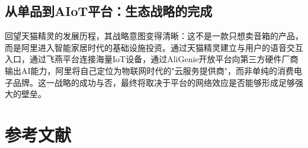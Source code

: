 \documentclass[12pt, a4paper, twoside, openright]{book}
\begin{document}
\section{从单品到AIoT平台：生态战略的完成}

回望天猫精灵的发展历程，其战略意图变得清晰：这不是一款只想卖音箱的产品，而是阿里进入智能家居时代的基础设施投资。通过天猫精灵建立与用户的语音交互入口，通过飞燕平台连接海量IoT设备，通过AliGenie开放平台向第三方硬件厂商输出AI能力，阿里将自己定位为物联网时代的"云服务提供商"，而非单纯的消费电子品牌。这一战略的成功与否，最终将取决于平台的网络效应是否能够形成足够强大的壁垒。

\backmatter
\chapter*{参考文献}
\end{document}
